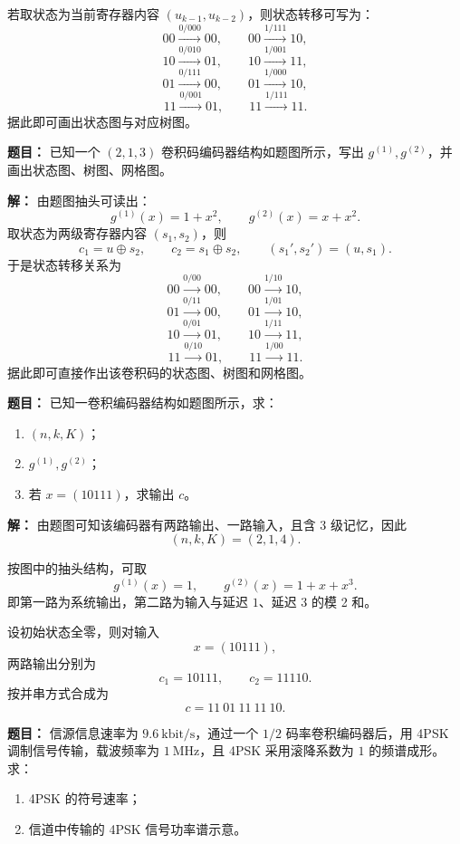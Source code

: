 若取状态为当前寄存器内容 $(u_{k-1},u_{k-2})$，则状态转移可写为：
\[
00\xrightarrow{0/000}00,\qquad 00\xrightarrow{1/111}10,
\]
\[
10\xrightarrow{0/010}01,\qquad 10\xrightarrow{1/001}11,
\]
\[
01\xrightarrow{0/111}00,\qquad 01\xrightarrow{1/000}10,
\]
\[
11\xrightarrow{0/001}01,\qquad 11\xrightarrow{1/111}11.
\]
据此即可画出状态图与对应树图。

\medskip
{}
\textbf{题目：}
已知一个 $(2,1,3)$ 卷积码编码器结构如题图所示，写出 $g^{(1)},g^{(2)}$，并画出状态图、树图、网格图。

\par\textbf{解：}
由题图抽头可读出：
\[
g^{(1)}(x)=1+x^2,\qquad g^{(2)}(x)=x+x^2.
\]
取状态为两级寄存器内容 $(s_1,s_2)$，则
\[
c_1=u\oplus s_2,\qquad c_2=s_1\oplus s_2,
\qquad (s_1',s_2')=(u,s_1).
\]
于是状态转移关系为
\[
00\xrightarrow{0/00}00,\qquad 00\xrightarrow{1/10}10,
\]
\[
01\xrightarrow{0/11}00,\qquad 01\xrightarrow{1/01}10,
\]
\[
10\xrightarrow{0/01}01,\qquad 10\xrightarrow{1/11}11,
\]
\[
11\xrightarrow{0/10}01,\qquad 11\xrightarrow{1/00}11.
\]
据此即可直接作出该卷积码的状态图、树图和网格图。

\medskip
{}
\textbf{题目：}
已知一卷积编码器结构如题图所示，求：
\begin{enumerate}
\item $(n,k,K)$；
\item $g^{(1)},g^{(2)}$；
\item 若 $x=(10111)$，求输出 $c$。
\end{enumerate}

\par\textbf{解：}
由题图可知该编码器有两路输出、一路输入，且含 $3$ 级记忆，因此
\[
(n,k,K)=(2,1,4).
\]

按图中的抽头结构，可取
\[
g^{(1)}(x)=1,\qquad g^{(2)}(x)=1+x+x^3.
\]
即第一路为系统输出，第二路为输入与延迟 $1$、延迟 $3$ 的模 2 和。

设初始状态全零，则对输入
\[
x=(10111),
\]
两路输出分别为
\[
c_1=10111,\qquad c_2=11110.
\]
按并串方式合成为
\[
c=11\ 01\ 11\ 11\ 10.
\]

\medskip
{}
\textbf{题目：}
信源信息速率为 $9.6\ \text{kbit/s}$，通过一个 $1/2$ 码率卷积编码器后，用 4PSK 调制信号传输，载波频率为 $1\ \text{MHz}$，且 4PSK 采用滚降系数为 $1$ 的频谱成形。求：
\begin{enumerate}
\item 4PSK 的符号速率；
\item 信道中传输的 4PSK 信号功率谱示意。
\end{enumerate}

